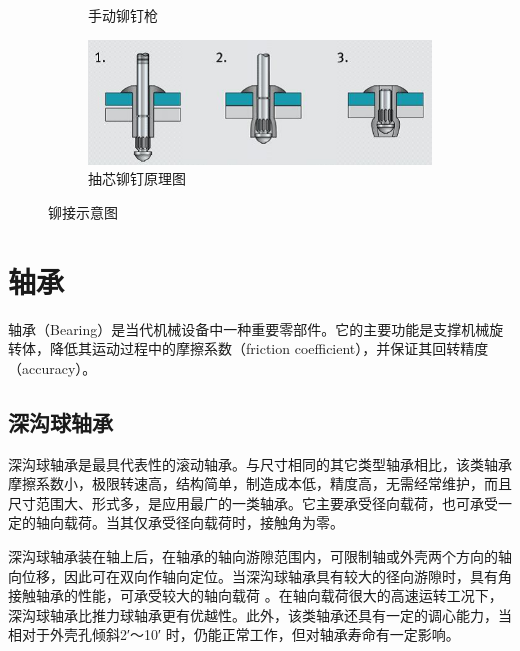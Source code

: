 \documentclass[UTF8]{article} %
\begin{document}
\begin{figure}[H]
\begin{subfigure}[b]{0.3\textwidth}
          \caption{手动铆钉枪}
  \end{subfigure}
  \begin{subfigure}[b]{0.5\textwidth}
    \centering
    \includegraphics[width=\textwidth]{mao4.png}
    \caption{抽芯铆钉原理图}
  \end{subfigure}
  \caption{铆接示意图}
\end{figure}

\section{轴承}
轴承（Bearing）是当代机械设备中一种重要零部件。它的主要功能是支撑机械旋转体，降低其运动过程中的摩擦系数（friction coefficient），并保证其回转精度（accuracy）。

\subsection{深沟球轴承}

深沟球轴承是最具代表性的滚动轴承。与尺寸相同的其它类型轴承相比，该类轴承摩擦系数小，极限转速高，结构简单，制造成本低，精度高，无需经常维护，而且尺寸范围大、形式多，是应用最广的一类轴承。它主要承受径向载荷，也可承受一定的轴向载荷。当其仅承受径向载荷时，接触角为零。

深沟球轴承装在轴上后，在轴承的轴向游隙范围内，可限制轴或外壳两个方向的轴向位移，因此可在双向作轴向定位。当深沟球轴承具有较大的径向游隙时，具有角接触轴承的性能，可承受较大的轴向载荷 。在轴向载荷很大的高速运转工况下，深沟球轴承比推力球轴承更有优越性。此外，该类轴承还具有一定的调心能力，当相对于外壳孔倾斜2′～10′ 时，仍能正常工作，但对轴承寿命有一定影响。
\end{document}
